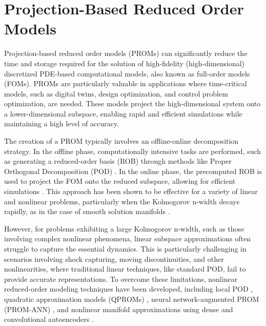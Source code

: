 \chapter{Projection-Based Reduced Order Models}

Projection-based reduced order models (PROMs) can significantly reduce the time and storage required for the solution of high-fidelity (high-dimensional) discretized PDE-based computational models, also known as full-order models (FOMs). PROMs are particularly valuable in applications where time-critical models, such as digital twins, design optimization, and control problem optimization, are needed. These models project the high-dimensional system onto a lower-dimensional subspace, enabling rapid and efficient simulations while maintaining a high level of accuracy.

The creation of a PROM typically involves an offline-online decomposition strategy. In the offline phase, computationally intensive tasks are performed, such as generating a reduced-order basis (ROB) through methods like Proper Orthogonal Decomposition (POD) \cite{Sirovich1987, Balachandar1998}. In the online phase, the precomputed ROB is used to project the FOM onto the reduced subspace, allowing for efficient simulations \cite{Antoulas2005, Cuong05}. This approach has been shown to be effective for a variety of linear and nonlinear problems, particularly when the Kolmogorov n-width decays rapidly, as in the case of smooth solution manifolds \cite{Rowley2004, Benner2015}.

However, for problems exhibiting a large Kolmogorov n-width, such as those involving complex nonlinear phenomena, linear subspace approximations often struggle to capture the essential dynamics. This is particularly challenging in scenarios involving shock capturing, moving discontinuities, and other nonlinearities, where traditional linear techniques, like standard POD, fail to provide accurate representations. To overcome these limitations, nonlinear reduced-order modeling techniques have been developed, including local POD \cite{Grimberg2021,Bravo2024}, quadratic approximation models (QPROMs) \cite{Barnett2022}, neural network-augmented PROM (PROM-ANN) \cite{Barnett2023}, and nonlinear manifold approximations using dense and convolutional autoencoders \cite{Lee2020, Romor2023}.


